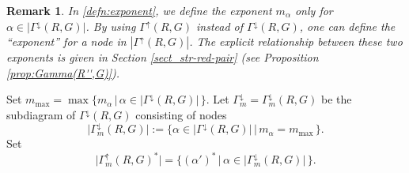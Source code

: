 \documentclass[11pt]{amsart}
\newcommand{\Z}{\mathbb{Z}}
\newcommand{\nr}{\mathrm{nr}}
\newcommand{\mc}{\, \underline{\mathrm{m}}^c}
\newtheorem{rem}[thm]{Remark}%
\begin{document}
{\begin{rem}
In  \eqref{defn:exponent}, we define the exponent $m_\alpha$ only
for $\alpha\in |\Gamma^\downarrow(R,G)|$.  By using 
$\Gamma^\uparrow(R,G)$ instead of $\Gamma^\downarrow(R,G)$, one can define
the ``exponent'' for a node in $|\Gamma^\uparrow(R,G)|$. The explicit relationship
between these two exponents is given in Section \ref{sect_str-red-pair} {\rm (}see
Proposition \ref{prop:Gamma(R'',G)}{\rm )}. 
\end{rem}


Set $m_{\max}=\max \{m_\alpha \, \vert \, \alpha \in |\Gamma^{\downarrow}(R,G)|\, \}$. 
Let $\Gamma_m^{\downarrow}=\Gamma_m^{\downarrow}(R,G)
$ 
be the subdiagram of 
$\Gamma^{\downarrow}(R,G)$ consisting of nodes 
\[  \vert \Gamma_m^{\downarrow}(R,G) \vert:=\{ \alpha \in \vert \Gamma^{\downarrow}(R,G)\vert \, 
\vert\, m_\alpha=m_{\max}\, \}.
\]
Set
\[ \vert \Gamma_m^{\uparrow}(R,G)^\ast \vert=\{ (\alpha')^\ast\, \vert \, 
\alpha \in \vert \Gamma_m^{\downarrow}(R,G) \vert\, \}.\]

}
\end{document}
